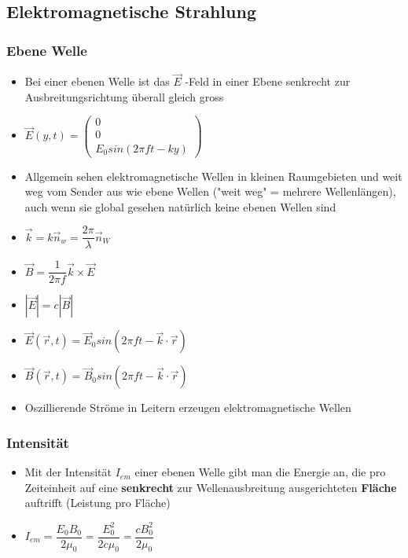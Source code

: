 \documentclass[8pt,a4paper]{scrartcl}
\begin{document}
\begin{multicols*}{3}
				\subsection{Elektromagnetische Strahlung}		
					\subsubsection{Ebene Welle}
						\begin{itemize}\itemsep0pt
							\item Bei einer ebenen Welle ist
das $\overrightarrow{E}$ -Feld in einer Ebene senkrecht zur Ausbreitungsrichtung überall gleich gross
							\item $\overrightarrow{E}(y,t) = \begin{pmatrix}0\\0\\E_{0}sin(2\pi ft-ky)\end{pmatrix}$
							\item Allgemein sehen elektromagnetische Wellen in kleinen Raumgebieten und weit weg vom Sender aus wie ebene Wellen ("weit weg" = mehrere Wellenlängen), auch wenn sie global gesehen natürlich keine ebenen Wellen sind
							\item $\overrightarrow{k}=k\overrightarrow{n}_{w}=\dfrac{2\pi}{\lambda}\overrightarrow{n}_{W}$
							\item $\overrightarrow{B}=\dfrac{1}{2\pi f}\overrightarrow{k}\times \overrightarrow{E}$
							\item $|\overrightarrow{E}| = c|\overrightarrow{B}|$
							\item $\overrightarrow{E}(\overrightarrow{r},t) = \overrightarrow{E}_{0}sin(2\pi ft-\overrightarrow{k}\cdot \overrightarrow{r})$
							\item $\overrightarrow{B}(\overrightarrow{r},t) = \overrightarrow{B}_{0}sin(2\pi ft-\overrightarrow{k}\cdot \overrightarrow{r})$
							\item Oszillierende Ströme in Leitern erzeugen elektromagnetische Wellen
						\end{itemize}	

					\subsubsection{Intensität}
						\begin{itemize}\itemsep0pt
							\item Mit der Intensität $I_{em}$ einer ebenen Welle gibt man die Energie an, die pro Zeiteinheit auf eine \textbf{senkrecht} zur Wellenausbreitung ausgerichteten \textbf{Fläche} auftrifft (Leistung pro Fläche)
							\item $I_{em}=\dfrac{E_{0}B_{0}}{2\mu_{0}}=\dfrac{E_{0}^{2}}{2c\mu_{0}} = \dfrac{cB_{0}^{2}}{2\mu_{0}}$
						\end{itemize}
						

\end{multicols*}
\end{document}
